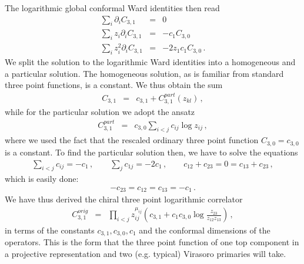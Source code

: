 \documentclass[12pt]{article}
\numberwithin{equation}{section}
\numberwithin{equation}{section}
\numberwithin{table}{section}\setlength{\multlinegap}{25pt}
\begin{document}
The logarithmic global conformal Ward identities then read 
\begin{eqnarray}
\sum_i \partial_i C_{3,1} &=& 0
\nonumber \\
\sum_i z_i \partial_i  C_{3,1} &=& -c_1 C_{3,0}
\nonumber \\
\sum_i z_i^2 \partial_i C_{3,1} &=& -2 z_1 c_1 C_{3,0} \, .
\end{eqnarray}
We split the solution to the logarithmic Ward identities into a homogeneous and a
particular solution. The homogeneous solution, as is familiar from standard three point functions,
is a constant. We thus obtain the  sum
\begin{eqnarray}
C_{3,1} &=& c_{3,1} + C_{3,1}^{part}(z_{kl}) \, ,
\end{eqnarray}
while for the particular solution we adopt the ansatz
\begin{eqnarray}
C_{3,1}^{part} &=& c_{3,0} \sum_{i<j} c_{ij} \log z_{ij} \, ,
\end{eqnarray}
where we used the fact that the rescaled ordinary three point function $C_{3,0}=c_{3,0}$ is a constant.
To find the particular solution then, we have to solve the equations
\begin{eqnarray}
\sum_{i<j} c_{ij} = -c_1 \, ,
\qquad 
 \sum_{j} c_{1j} = - 2 c_1 \, ,
\qquad
c_{12}+c_{23} = 0 = c_{13}+c_{23} \, ,
\end{eqnarray}
which is easily done:
\begin{eqnarray}
-c_{23} = c_{12}=c_{13} = -c_1
\, .
\end{eqnarray}
We have thus derived the chiral three point logarithmic correlator
\begin{eqnarray}
C_{3,1}^{orig} &=& \prod_{i<j} z_{ij}^{\mu_{ij}} (c_{3,1} + c_1 c_{3,0} \log \frac{z_{23}}{z_{12} z_{13}} ) \, ,
\label{solWard31}
\end{eqnarray}
in terms of the constants $c_{3,1},c_{3,0},c_1$ and the conformal dimensions of the operators. This is the form
that the three point function of one top component in a projective representation and two (e.g. typical) Virasoro 
primaries will take.
\end{document}
